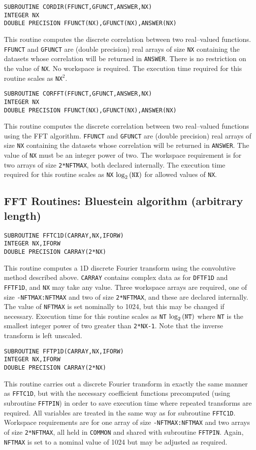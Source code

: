\documentclass[dvips]{article}
\begin{document}
\begin{verbatim}
SUBROUTINE CORDIR(FFUNCT,GFUNCT,ANSWER,NX)
INTEGER NX
DOUBLE PRECISION FFUNCT(NX),GFUNCT(NX),ANSWER(NX)
\end{verbatim}
This routine computes the discrete correlation between two real--valued
functions.
{\tt FFUNCT} and {\tt GFUNCT} are (double precision) real arrays of size
{\tt NX} containing
the datasets whose correlation will be returned in {\tt ANSWER}.  There is no
restriction on the value of {\tt NX}.  No workspace is required.  The execution
time required for this routine scales as {\tt NX}$^{2}$.

\begin{verbatim}
SUBROUTINE CORFFT(FFUNCT,GFUNCT,ANSWER,NX)
INTEGER NX
DOUBLE PRECISION FFUNCT(NX),GFUNCT(NX),ANSWER(NX)
\end{verbatim}
This routine computes the discrete correlation between two real--valued functions
using the FFT algorithm.
{\tt FFUNCT} and {\tt GFUNCT} are (double precision) real arrays of size
{\tt NX} containing
the datasets whose correlation will be returned in {\tt ANSWER}.  The value of
{\tt NX} must be an integer power of two.  The workspace requirement is for two
arrays of size {\tt 2*NFTMAX}, both declared internally.  The execution time
required for this routine scales as {\tt NX} $\log_{2}{({\tt NX})}$ for allowed
values of {\tt NX}.

\subsection*{FFT Routines: Bluestein algorithm (arbitrary length)}
\begin{verbatim}
SUBROUTINE FFTC1D(CARRAY,NX,IFORW)
INTEGER NX,IFORW
DOUBLE PRECISION CARRAY(2*NX)
\end{verbatim}
This routine computes a 1D discrete Fourier transform using the convolutive
method described above.
{\tt CARRAY} contains complex data as for {\tt DFTF1D} and {\tt FFTF1D},
and {\tt NX} may take any value.  Three workspace arrays are required,
one of size {\tt -NFTMAX:NFTMAX} and two of size
{\tt 2*NFTMAX}, and these are declared internally.  The value of {\tt NFTMAX} is
set nominally to 1024, but this may be changed if necessary.  Execution
time for this routine scales as {\tt NT} $\log_{2}{({\tt NT})}$ where {\tt NT}
is the smallest integer power of two greater than {\tt 2*NX-1}.  Note that
the inverse transform is left unscaled.

\begin{verbatim}
SUBROUTINE FFTP1D(CARRAY,NX,IFORW)
INTEGER NX,IFORW
DOUBLE PRECISION CARRAY(2*NX)
\end{verbatim}
This routine carries out a discrete Fourier transform in exactly the
same manner as {\tt FFTC1D}, but with the necessary coefficient functions
precomputed (using subroutine {\tt FFTPIN}) in order to save
execution time where repeated transforms are required.
All variables are treated in the same way as for subroutine {\tt FFTC1D}.
Workspace requirements are for one array of size {\tt -NFTMAX:NFTMAX}
and two arrays of size {\tt 2*NFTMAX}, all
held in {\tt COMMON} and shared with subroutine {\tt FFTPIN}.
Again, {\tt NFTMAX} is set to a nominal value of 1024 but may be adjusted
as required.
\end{document}
